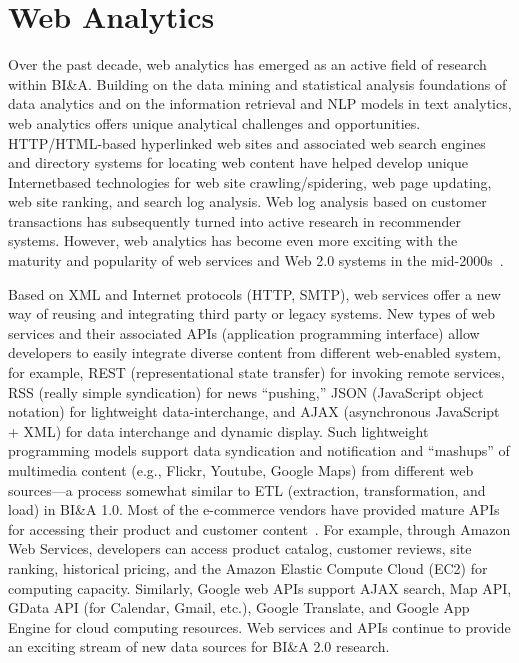 \section{Web Analytics}

Over the past decade, web analytics has emerged as an active
field of research within BI\&A. Building on the data mining
and statistical analysis foundations of data analytics and on
the information retrieval and NLP models in text analytics,
web analytics offers unique analytical challenges and
opportunities. HTTP/HTML-based hyperlinked web sites and
associated web search engines and directory systems for
locating web content have helped develop unique Internetbased
technologies for web site crawling/spidering, web page
updating, web site ranking, and search log analysis. Web log
analysis based on customer transactions has subsequently
turned into active research in recommender systems. However,
web analytics has become even more exciting with the
maturity and popularity of web services and Web 2.0 systems
in the mid-2000s~\cite{OReilly:2005}. 

Based on XML and Internet protocols (HTTP, SMTP), web
services offer a new way of reusing and integrating third party
or legacy systems. New types of web services and their
associated APIs (application programming interface) allow
developers to easily integrate diverse content from different
web-enabled system, for example, REST (representational
state transfer) for invoking remote services, RSS (really
simple syndication) for news “pushing,” JSON (JavaScript
object notation) for lightweight data-interchange, and AJAX
(asynchronous JavaScript + XML) for data interchange and
dynamic display. Such lightweight programming models
support data syndication and notification and “mashups” of
multimedia content (e.g., Flickr, Youtube, Google Maps)
from different web sources—a process somewhat similar to
ETL (extraction, transformation, and load) in BI\&A 1.0.
Most of the e-commerce vendors have provided mature APIs
for accessing their product and customer content~\cite{Schonfeld:2005}. For example, through Amazon Web Services, developers
can access product catalog, customer reviews, site
ranking, historical pricing, and the Amazon Elastic Compute
Cloud (EC2) for computing capacity. Similarly, Google web
APIs support AJAX search, Map API, GData API (for
Calendar, Gmail, etc.), Google Translate, and Google App
Engine for cloud computing resources. Web services and
APIs continue to provide an exciting stream of new data
sources for BI\&A 2.0 research.

